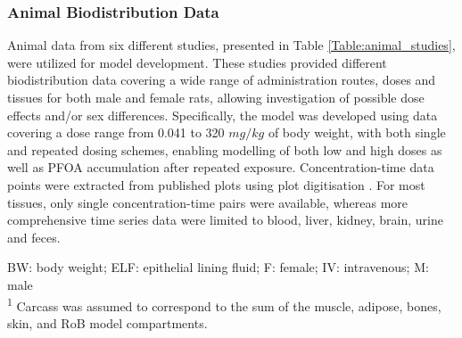 \documentclass[preprint,12pt,authoryear]{elsarticle}
\begin{document}
\subsubsection{Animal Biodistribution Data}
Animal data from six different studies, presented in Table \ref{Table:animal_studies}, were utilized for model development. These studies provided different biodistribution data covering a wide range of administration routes, doses and tissues for both male and female rats, allowing investigation of possible dose effects and/or sex differences. Specifically, the model was developed using data covering a dose range from 0.041 to 320 $mg/kg$ of body weight, with both single and repeated dosing schemes, enabling modelling of  both low and high doses as well as PFOA accumulation after repeated exposure. Concentration-time data points were extracted from published plots using plot digitisation \citep{webPlotDigitizer}. For most tissues, only single concentration-time pairs were available, whereas more comprehensive time series data were limited to  blood, liver, kidney, brain, urine and feces. 

\begin{table}[H]
\centering
\caption{Animal studies used for model development.}
\label{Table:animal_studies}

\raggedright
\footnotesize
\vspace{0.5em}
\raggedright
\scriptsize
BW: body weight; ELF: epithelial lining fluid; F: female;  IV: intravenous; M: male \\
\textsuperscript{1} Carcass was assumed to correspond to the sum of the muscle, adipose, bones, skin, and RoB model compartments.
\end{table}
\end{document}
